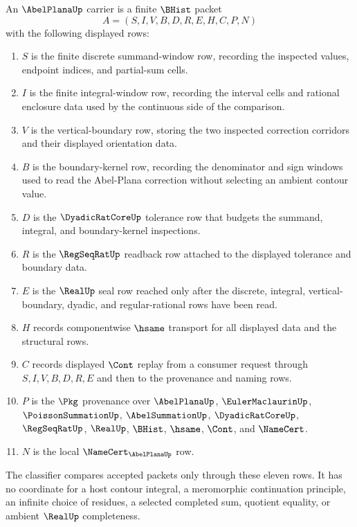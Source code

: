 \begin{definition}
\label{def:abel-plana-carrier}
An $\AbelPlanaUp$ carrier is a finite $\BHist$ packet
$$
A=(S,I,V,B,D,R,E,H,C,P,N)
$$
with the following displayed rows:
\begin{enumerate}
\item $S$ is the finite discrete summand-window row, recording the inspected values, endpoint indices, and partial-sum cells.
\item $I$ is the finite integral-window row, recording the interval cells and rational enclosure data used by the continuous side of the comparison.
\item $V$ is the vertical-boundary row, storing the two inspected correction corridors and their displayed orientation data.
\item $B$ is the boundary-kernel row, recording the denominator and sign windows used to read the Abel-Plana correction without selecting an ambient contour value.
\item $D$ is the $\DyadicRatCoreUp$ tolerance row that budgets the summand, integral, and boundary-kernel inspections.
\item $R$ is the $\RegSeqRatUp$ readback row attached to the displayed tolerance and boundary data.
\item $E$ is the $\RealUp$ seal row reached only after the discrete, integral, vertical-boundary, dyadic, and regular-rational rows have been read.
\item $H$ records componentwise $\hsame$ transport for all displayed data and the structural rows.
\item $C$ records displayed $\Cont$ replay from a consumer request through $S,I,V,B,D,R,E$ and then to the provenance and naming rows.
\item $P$ is the $\Pkg$ provenance over $\AbelPlanaUp$, $\EulerMaclaurinUp$, $\PoissonSummationUp$, $\AbelSummationUp$, $\DyadicRatCoreUp$, $\RegSeqRatUp$, $\RealUp$, $\BHist$, $\hsame$, $\Cont$, and $\NameCert$.
\item $N$ is the local $\NameCert_{\AbelPlanaUp}$ row.
\end{enumerate}
The classifier compares accepted packets only through these eleven rows. It has no coordinate for a host contour integral, a meromorphic continuation principle, an infinite choice of residues, a selected completed sum, quotient equality, or ambient $\RealUp$ completeness.
\end{definition}

